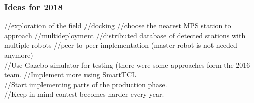 \subsubsection{Ideas for 2018}

//exploration of the field
//docking 
//choose the nearest MPS station to approach
//multideployment 
//distributed database of detected stations with multiple robots
//peer to peer implementation (master robot is not needed anymore) \\

//Use Gazebo simulator for testing (there were some approaches 
form the 2016 team. 
//Implement more using SmartTCL \\

//Start implementing parts of the production phase. \\

//Keep in mind contest becomes harder every year. 